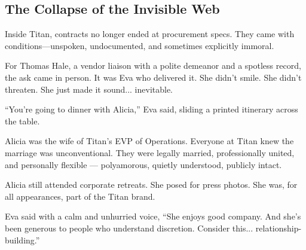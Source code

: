 \subsection{The Collapse of the Invisible Web}

Inside Titan, contracts no longer ended at procurement specs.
They came with conditions—unspoken, undocumented, and sometimes explicitly immoral.

For Thomas Hale, a vendor liaison with a polite demeanor and a spotless record, the ask came in person.
It was Eva who delivered it.
She didn’t smile. She didn’t threaten. She just made it sound... inevitable.

\medskip

“You’re going to dinner with Alicia,” Eva said, sliding a printed itinerary across the table.

Alicia was the wife of Titan’s EVP of Operations.
Everyone at Titan knew the marriage was unconventional.
They were legally married, professionally united, and personally flexible — polyamorous, quietly understood, publicly intact.

Alicia still attended corporate retreats.
She posed for press photos.
She was, for all appearances, part of the Titan brand.

Eva said with a calm and unhurried voice, ``She enjoys good company. And she’s been generous to people who understand discretion. Consider this... relationship-building.''

\medskip

